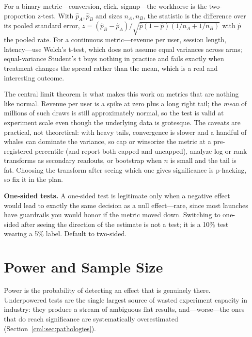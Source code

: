 For a binary metric---conversion, click, signup---the workhorse is the two-proportion z-test. With $\hat p_A, \hat p_B$ and sizes $n_A, n_B$, the statistic is the difference over its pooled standard error, $z = (\hat p_B - \hat p_A)/\sqrt{\hat p(1-\hat p)(1/n_A + 1/n_B)}$ with $\hat p$ the pooled rate. For a continuous metric---revenue per user, session length, latency---use Welch's t-test, which does not assume equal variances across arms; equal-variance Student's t buys nothing in practice and fails exactly when treatment changes the spread rather than the mean, which is a real and interesting outcome.

The central limit theorem is what makes this work on metrics that are nothing like normal. Revenue per user is a spike at zero plus a long right tail; the \emph{mean} of millions of such draws is still approximately normal, so the test is valid at experiment scale even though the underlying data is grotesque. The caveats are practical, not theoretical: with heavy tails, convergence is slower and a handful of whales can dominate the variance, so cap or winsorize the metric at a pre-registered percentile (and report both capped and uncapped), analyze log or rank transforms as secondary readouts, or bootstrap when $n$ is small and the tail is fat. Choosing the transform after seeing which one gives significance is p-hacking, so fix it in the plan.

\begin{warningbox}
\textbf{One-sided tests.} A one-sided test is legitimate only when a negative effect would lead to exactly the same decision as a null effect---rare, since most launches have guardrails you would honor if the metric moved down. Switching to one-sided after seeing the direction of the estimate is not a test; it is a 10\% test wearing a 5\% label. Default to two-sided.
\end{warningbox}

\section{Power and Sample Size}
\label{cml:sec:power}

Power is the probability of detecting an effect that is genuinely there. Underpowered tests are the single largest source of wasted experiment capacity in industry: they produce a stream of ambiguous flat results, and---worse---the ones that do reach significance are systematically overestimated (Section~\ref{cml:sec:pathologies}).

